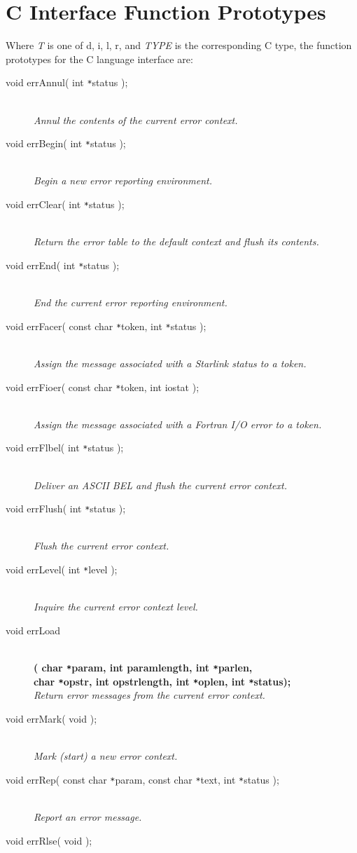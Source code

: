 \documentclass[twoside,11pt]{article}
\newcommand{\xlabel}[1]{}
\renewcommand{\_}{\texttt{\symbol{95}}}
\newcommand{\listline}{\hspace{1pt}\\}
\newcommand{\listline}{}
\begin{document}
\section{\xlabel{c_interface_function_prototypes}C Interface Function Prototypes} \label{C_sect}
Where \textit{T} is one of d, i, l, r, and \textit{TYPE} is the corresponding C
type, the function prototypes for the C language interface are:
\begin{description}
\item[void errAnnul( int \texttt{*}status );] \listline
\textit{Annul the contents of the current error context.}
\item[void errBegin( int \texttt{*}status );] \listline
\textit{Begin a new error reporting environment.}
\item[void errClear( int \texttt{*}status );] \listline
\textit{Return the error table to the default context and flush its contents.}
\item[void errEnd( int \texttt{*}status );] \listline
\textit{End the current error reporting environment.}
\item[void errFacer( const char \texttt{*}token, int \texttt{*}status );] \listline
\textit{Assign the message associated with a Starlink status to a token.}
\item[void errFioer( const char \texttt{*}token, int iostat );] \listline
\textit{Assign the message associated with a Fortran I/O error to a token.}
\item[void errFlbel( int \texttt{*}status );] \listline
\textit{Deliver an ASCII BEL and flush the current error context.}
\item[void errFlush( int \texttt{*}status );] \listline
\textit{Flush the current error context.}
\item[void errLevel( int \texttt{*}level );] \listline
\textit{Inquire the current error context level.}
\item[void errLoad] \listline
\textbf{( char \texttt{*}param, int param\_length, int
\texttt{*}parlen,  {\listline}
char \texttt{*}opstr, int opstr\_length, int \texttt{*}oplen,
int \texttt{*}status);} \\
\textit{Return error messages from the current error context.}
\item[void errMark( void );] \listline
\textit{Mark (start) a new error context.}
\item[void errRep( const char \texttt{*}param, const char \texttt{*}text,
int \texttt{*}status );] \listline
\textit{Report an error message.}
\item[void errRlse( void );] \listline

\end{description}
\end{document}
